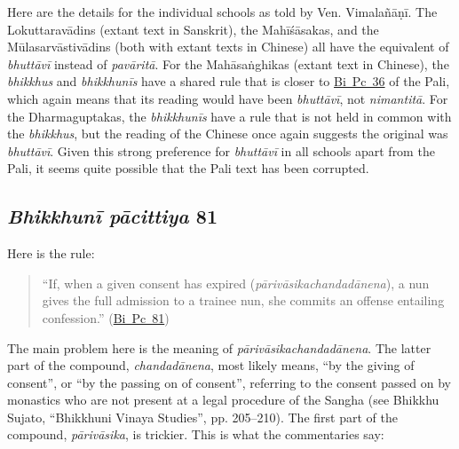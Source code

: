 \documentclass[12pt,openany]{book}%
\begin{document}
Here are the details for the individual schools as told by Ven. \textsanskrit{Vimalañāṇī}. The \textsanskrit{Lokuttaravādins} (extant text in Sanskrit), the \textsanskrit{Mahīśāsakas}, and the \textsanskrit{Mūlasarvāstivādins} (both with extant texts in Chinese) all have the equivalent of \textit{\textsanskrit{bhuttāvī}} instead of \textit{\textsanskrit{pavāritā}}. For the \textsanskrit{Mahāsaṅghikas} (extant text in Chinese), the \textit{bhikkhus} and \textit{\textsanskrit{bhikkhunīs}} have a shared rule that is closer to \href{https://suttacentral.net/pli-tv-bu-vb-pc36/en/brahmali\#1.28.1}{Bi~Pc~36} of the Pali, which again means that its reading would have been \textit{\textsanskrit{bhuttāvī}}, not \textit{\textsanskrit{nimantitā}}. For the Dharmaguptakas, the \textit{\textsanskrit{bhikkhunīs}} have a rule that is not held in common with the \textit{bhikkhus}, but the reading of the Chinese once again suggests the original was \textit{\textsanskrit{bhuttāvī}}. Given this strong preference for \textit{\textsanskrit{bhuttāvī}} in all schools apart from the Pali, it seems quite possible that the Pali text has been corrupted.

\subsection*{\textit{\textsanskrit{Bhikkhunī} \textsanskrit{pācittiya}} 81}

Here is the rule:

\begin{quotation}%
“If, when a given consent has expired (\textit{\textsanskrit{pārivāsikachandadānena}}), a nun gives the full admission to a trainee nun, she commits an offense entailing confession.” (\href{https://suttacentral.net/pli-tv-bi-vb-pc81/en/brahmali\#1.13.1}{Bi~Pc~81})

%
\end{quotation}

The main problem here is the meaning of \textit{\textsanskrit{pārivāsikachandadānena}}. The latter part of the compound, \textit{\textsanskrit{chandadānena}}, most likely means, “by the giving of consent”, or “by the passing on of consent”, referring to the consent passed on by monastics who are not present at a legal procedure of the Sangha (see Bhikkhu Sujato, “Bhikkhuni Vinaya Studies”, pp. 205–210). The first part of the compound, \textit{\textsanskrit{pārivāsika}}, is trickier. This is what the commentaries say:
\end{document}

